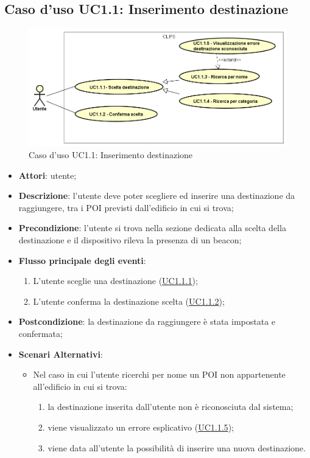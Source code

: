 \documentclass[../AnalisiDeiRequisiti.tex]{subfiles}
\begin{document}
\subsection{Caso d'uso UC1.1: Inserimento destinazione}

        \begin{figure}[!h]
            \centering
            \includegraphics[scale=0.95, width=\textwidth]{img/UC1-1.png}
            \caption{Caso d'uso UC1.1: Inserimento destinazione}\label{fig:UC1.1} 
        \end{figure}
\begin{itemize}
\item \textbf{Attori}: utente;
\item \textbf{Descrizione}: l'utente deve poter scegliere ed inserire una destinazione da raggiungere, tra i POI previsti dall'edificio in cui si trova; 
      \item \textbf{Precondizione}: l'utente si trova nella sezione dedicata alla scelta della destinazione e il dispositivo rileva la presenza di un beacon;

        \item \textbf{Flusso principale degli eventi}:
          \begin{enumerate}
          \item L'utente sceglie una destinazione  (\hyperlink{UC1.1.1}{UC1.1.1});
          \item L'utente conferma la destinazione scelta  (\hyperlink{UC1.1.2}{UC1.1.2});

      \end{enumerate}
	 \item \textbf{Postcondizione}: la destinazione da raggiungere è stata impostata e confermata;
    \item \textbf{Scenari Alternativi}:
    	\begin{itemize}
    		\item Nel caso in cui l'utente ricerchi per nome un POI non appartenente all'edificio in cui si trova:
      		\begin{enumerate}
      			\item la destinazione inserita dall'utente non è riconosciuta dal sistema;
          		\item viene visualizzato un errore esplicativo (\hyperlink{UC1.1.5}{UC1.1.5});
          		\item viene data all'utente la possibilità di inserire una nuova destinazione.
      		\end{enumerate}
      	\end{itemize}
   
  \end{itemize}
\hypertarget{UC1.1.1}{}
\end{document}
